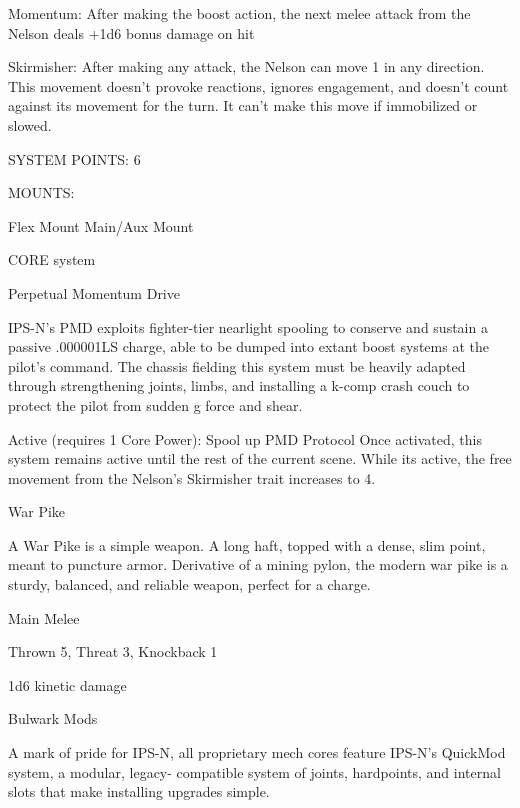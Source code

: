   Momentum: After making the boost action, the next melee attack from the Nelson deals +1d6 bonus  
  damage on hit
 
  Skirmisher: After making any attack, the Nelson can move 1 in any direction. This movement doesn’t  
  provoke reactions, ignores engagement, and doesn’t count against its movement for the turn. It can’t  
  make this move if immobilized or slowed. 

                                               SYSTEM POINTS: 6 

                                                    MOUNTS: 

  Flex Mount                          Main/Aux Mount 

                                                  CORE system 

                                                                                                                


                                             Perpetual Momentum Drive 

  IPS-N’s PMD exploits fighter-tier nearlight spooling to conserve and sustain a passive .000001LS 
  charge, able to be dumped into extant boost systems at the pilot’s command. The chassis fielding this 
  system must be heavily adapted through strengthening joints, limbs, and installing a k-comp crash 
  couch to protect the pilot from sudden g force and shear. 

  Active (requires 1 Core Power): Spool up PMD 
   Protocol 
   Once activated, this system remains active until the rest of the current scene. While its active, the free 
   movement from the Nelson’s Skirmisher trait increases to 4. 

War Pike  

A War Pike is a simple weapon. A long haft, topped with a dense, slim point, meant to puncture armor.  
Derivative of a mining pylon, the modern war pike is a sturdy, balanced, and reliable weapon, perfect for a  
charge.    

Main Melee
 
Thrown 5, Threat 3, Knockback 1
 
1d6 kinetic damage
 

Bulwark Mods  

A mark of pride for IPS-N, all proprietary mech cores feature IPS-N’s QuickMod system, a modular, legacy- 
compatible system of joints, hardpoints, and internal slots that make installing upgrades simple.   


